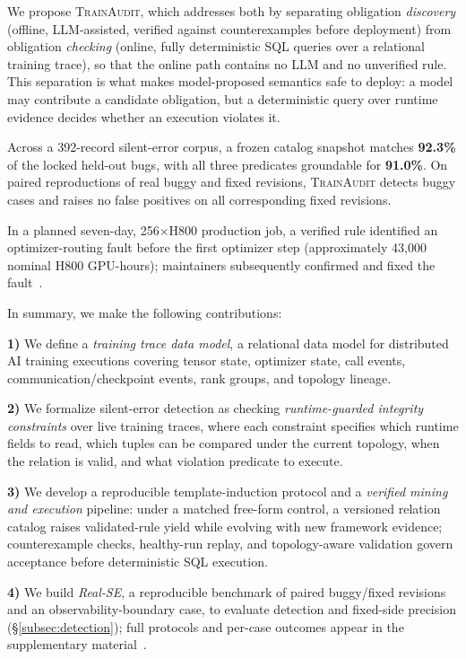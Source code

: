 \documentclass[sigconf,nonacm]{acmart}
\begin{document}
We propose \textsc{TrainAudit}, which addresses both by separating obligation
\emph{discovery} (offline, LLM-assisted, verified against counterexamples before
deployment) from obligation \emph{checking} (online, fully deterministic SQL
queries over a relational training trace), so that the online path contains no
LLM and no unverified rule. This separation is what makes model-proposed
semantics safe to deploy: a model may contribute a candidate obligation, but a
deterministic query over runtime evidence decides whether an execution violates
it.

Across a 392-record silent-error corpus, a frozen catalog snapshot matches
\textbf{92.3\%} of the locked held-out bugs, with all three predicates
groundable for \textbf{91.0\%}. On paired reproductions of real buggy and fixed
revisions, \textsc{TrainAudit} detects \textbf{\RealSEDetFrac} buggy cases and
raises no false positives on all \NumFixedReplay{} corresponding fixed
revisions.

In a planned seven-day, 256$\times$H800 production job, a verified rule
identified an optimizer-routing fault before the first optimizer step
(approximately 43{,}000 nominal H800 GPU-hours); maintainers subsequently
confirmed and fixed the fault~\cite{ye2026megatronMuonRouting}.

\noindent In summary, we make the following contributions:

\noindent\textbf{1)} We define a \emph{training trace data model}, a relational data model for distributed AI training executions covering tensor state, optimizer state, call events, communication/checkpoint events, rank groups, and topology lineage.

\noindent\textbf{2)} We formalize silent-error detection as checking \emph{runtime-guarded integrity constraints} over live training traces, where each constraint specifies which runtime fields to read, which tuples can be compared under the current topology, when the relation is valid, and what violation predicate to execute.

\noindent\textbf{3)} We develop a reproducible template-induction protocol and a \emph{verified mining and execution} pipeline: under a matched free-form control, a versioned relation catalog raises validated-rule yield while evolving with new framework evidence; counterexample checks, healthy-run replay, and topology-aware validation govern acceptance before deterministic SQL execution.

\noindent\textbf{4)} We build \emph{Real-SE}, a reproducible benchmark of paired buggy/fixed revisions and an observability-boundary case, to evaluate detection and fixed-side precision (\S\ref{subsec:detection}); full protocols and per-case outcomes appear in the supplementary material~\cite{trainaudit-supplement}.
\end{document}
